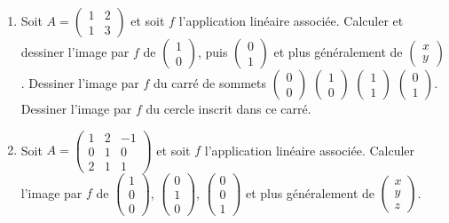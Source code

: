 \documentclass[class=report,crop=false]{standalone}
\begin{document}
\begin{miniexercices}
\sauteligne
\begin{enumerate}
  \item Soit $A=\left(\begin{smallmatrix} 1 & 2 \\ 1 & 3 \end{smallmatrix} \right)$
  et soit $f$ l'application linéaire associée. Calculer et dessiner l'image par $f$ de
  $\left(\begin{smallmatrix} 1 \\ 0 \end{smallmatrix} \right)$, puis
  $\left(\begin{smallmatrix} 0 \\ 1 \end{smallmatrix} \right)$
et plus généralement de $\left(\begin{smallmatrix} x \\ y \end{smallmatrix} \right)$.
Dessiner l'image par $f$ du carré de sommets
$\left(\begin{smallmatrix} 0 \\ 0 \end{smallmatrix} \right)$
$\left(\begin{smallmatrix} 1 \\ 0 \end{smallmatrix} \right)$
$\left(\begin{smallmatrix} 1 \\ 1 \end{smallmatrix} \right)$
$\left(\begin{smallmatrix} 0 \\ 1 \end{smallmatrix} \right)$.
Dessiner l'image par $f$ du cercle inscrit dans ce carré.

  \item Soit $A=\left(\begin{smallmatrix} 1 & 2 & -1 \\ 0 & 1 & 0 \\ 2 & 1 & 1 \end{smallmatrix} \right)$
  et soit $f$ l'application linéaire associée. Calculer l'image par $f$ de
  $\left(\begin{smallmatrix} 1 \\ 0 \\ 0 \end{smallmatrix} \right)$,
  $\left(\begin{smallmatrix} 0 \\ 1 \\ 0 \end{smallmatrix} \right)$,
  $\left(\begin{smallmatrix} 0 \\ 0 \\ 1 \end{smallmatrix} \right)$
et plus généralement de $\left(\begin{smallmatrix} x \\ y \\z \end{smallmatrix} \right)$.



\end{enumerate}
\end{miniexercices}
\end{document}

